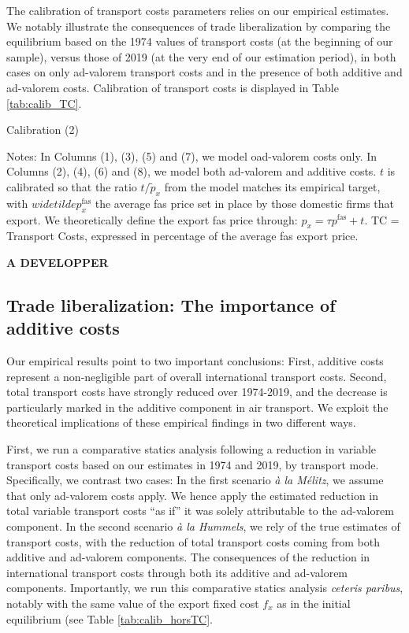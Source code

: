 \documentclass[a4paper,11pt]{article}
\begin{document}
The calibration of transport costs parameters relies on our empirical estimates. We notably illustrate the consequences of trade liberalization by comparing the equilibrium based on the 1974 values of transport costs (at the beginning of our sample), versus those of 2019 (at the very end of our estimation period), in both cases on only ad-valorem transport costs and in the presence of both additive and ad-valorem costs. Calibration of transport costs is displayed in Table \ref{tab:calib_TC}.

\begin{table}[htbp]
  \centering
  \caption{Calibration (2)}\label{tab:calib_TC}
\begin{center}
	
\end{center}
{\parbox[l]{12cm}{ \vspace{4pt}\footnotesize{Notes: In Columns (1), (3), (5) and (7), we model oad-valorem costs only. In Columns (2), (4), (6) and (8), we model both ad-valorem and additive costs. $t$ is calibrated so that the ratio $t/\widetilde{p}_x$ from the model matches its empirical target, with $widetilde{p}^{\text{fas}}_x$ the average fas price set in place by those domestic firms that export. We theoretically define the export fas price through: $p_x = \tau p^{\text{fas}} +t$. TC = Transport Costs, expressed in percentage of the average fas export price.}}}
\end{table}


\textbf{A DEVELOPPER}

\subsection{Trade liberalization: The importance of additive costs}

Our empirical results point to two important conclusions: First, additive costs represent a non-negligible part of overall international transport costs. Second, total transport costs have strongly reduced over 1974-2019, and the decrease is particularly marked in the additive component in air transport. We exploit the theoretical implications of these empirical findings in two different ways.

First, we run a comparative statics analysis following a reduction in variable transport costs based on our estimates in 1974 and 2019, by transport mode. Specifically, we contrast two cases: In the first scenario \textit{à la Mélitz}, we assume that only ad-valorem costs apply. We hence apply the estimated reduction in total variable transport costs ``as if'' it was solely attributable to the ad-valorem component. In the second scenario \textit{à la Hummels}, we rely of the true estimates of transport costs, with the reduction of total transport costs coming from both additive and ad-valorem components. The consequences of the reduction in international transport costs through both its additive and ad-valorem components. Importantly, we run this comparative statics analysis \textit{ceteris paribus}, notably with the same value of the export fixed cost $f_x$ as in the initial equilibrium (see Table \ref{tab:calib_horsTC}.
\end{document}
